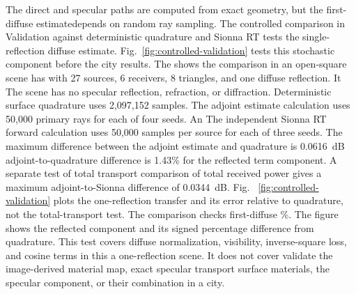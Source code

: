 \documentclass{IEEEoj} %
\providecommand{\DIFadd}[1]{{\protect\color{blue} \sf #1}} %
\providecommand{\DIFdel}[1]{{\protect\color{red} \scriptsize #1}} %
\providecommand{\DIFaddbegin}{} %
\providecommand{\DIFaddend}{} %
\providecommand{\DIFdelbegin}{} %
\providecommand{\DIFdelend}{} %
\begin{document}
\DIFdelend %
\DIFdelbegin \DIFdel{The direct and specular paths are computed from exact geometry, but the
first-diffuse estimatedepends on random ray sampling. The controlled comparison
in }\DIFdelend \DIFaddbegin \DIFadd{Validation against deterministic quadrature and Sionna RT tests the
single-reflection diffuse estimate. }\DIFaddend Fig.~\ref{fig:controlled-validation} \DIFdelbegin \DIFdel{tests this stochastic component before
the city results. The }\DIFdelend \DIFaddbegin \DIFadd{shows
the comparison in an }\DIFaddend open-square scene \DIFdelbegin \DIFdel{has }\DIFdelend \DIFaddbegin \DIFadd{with }\DIFaddend 27 sources, 6 receivers, 8
triangles, and one diffuse reflection. \DIFdelbegin \DIFdel{It }\DIFdelend \DIFaddbegin \DIFadd{The scene }\DIFaddend has no specular reflection,
refraction, or diffraction. Deterministic surface quadrature uses 2,097,152
samples. The adjoint \DIFdelbegin \DIFdel{estimate }\DIFdelend \DIFaddbegin \DIFadd{calculation }\DIFaddend uses 50,000 primary rays for each of four
seeds. \DIFdelbegin \DIFdel{An }\DIFdelend \DIFaddbegin \DIFadd{The }\DIFaddend independent Sionna RT forward calculation uses 50,000 samples per
source for each of three seeds. The maximum \DIFdelbegin \DIFdel{difference
between the adjoint estimate and quadrature is
0.0616~dB }\DIFdelend \DIFaddbegin \DIFadd{adjoint-to-quadrature difference is
1.43\% }\DIFaddend for the reflected \DIFdelbegin \DIFdel{term}\DIFdelend \DIFaddbegin \DIFadd{component}\DIFaddend . A separate \DIFdelbegin \DIFdel{test of total transport }\DIFdelend \DIFaddbegin \DIFadd{comparison of total received
power }\DIFaddend gives a maximum adjoint-to-Sionna difference of \DIFdelbegin \DIFdel{0.0344~dB. Fig. ~\ref{fig:controlled-validation} plots the one-reflection
transfer and its error relative to quadrature, not the total-transport test. The
comparison checks first-diffuse }\DIFdelend \DIFaddbegin \DIFadd{0.80\%. The figure shows
the reflected component and its signed percentage difference from quadrature. This test
covers diffuse }\DIFaddend normalization, visibility, inverse-square loss, and cosine terms
in \DIFdelbegin \DIFdel{this }\DIFdelend \DIFaddbegin \DIFadd{a }\DIFaddend one-reflection scene. It does not \DIFdelbegin \DIFdel{cover }\DIFdelend \DIFaddbegin \DIFadd{validate }\DIFaddend the image-derived \DIFdelbegin \DIFdel{material map, exact specular transport}\DIFdelend \DIFaddbegin \DIFadd{surface
materials, the specular component}\DIFaddend , or their combination in a city.
\end{document}
